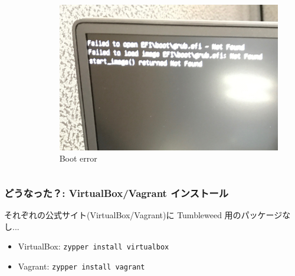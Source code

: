 \documentclass[aspectratio=169,11pt,hyperref={colorlinks=true}]{beamer}
\begin{document}
\begin{frame}
\begin{columns}[T]
\begin{column}{0.28\textwidth}
\begin{figure}
\begin{center}
        \end{center}
      \end{figure}
    \end{column}
    \begin{column}{0.28\textwidth}
      \begin{figure}
        \begin{center}
          \caption{Boot error}
          \includegraphics[width=1.0\textwidth]{boot.jpg}
        \end{center}
      \end{figure}
    \end{column}
  \end{columns}
\end{frame}

\begin{frame}
  \frametitle{どうなった？: VirtualBox/Vagrant インストール}
  それぞれの公式サイト(VirtualBox/Vagrant)に Tumbleweed 用のパッケージなし...
  \begin{itemize}
    \item VirtualBox: \lstinline[basicstyle=\ttfamily\footnotesize,columns=fixed]{zypper install virtualbox}
    \item Vagrant: \lstinline[basicstyle=\ttfamily\footnotesize,columns=fixed]{zypper install vagrant}
  \end{itemize}
\end{frame}
\end{document}
